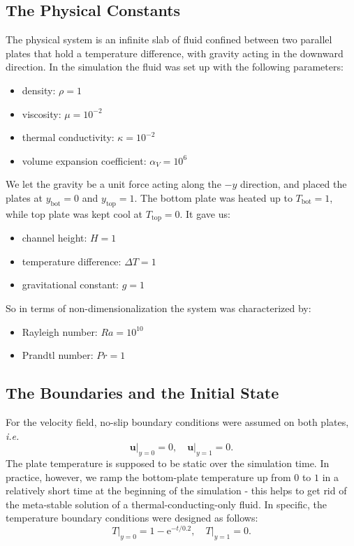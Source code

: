 \subsection{The Physical Constants}
The physical system is an infinite slab of fluid confined between two parallel plates that hold a temperature difference, with gravity acting in the downward direction. In the simulation the fluid was set up with the following parameters:
\begin{itemize}
    \item density: $\rho=1$
    \item viscosity: $\mu=10^{-2}$
    \item thermal conductivity: $\kappa=10^{-2}$
    \item volume expansion coefficient: $\alpha_V=10^6$
\end{itemize}
We let the gravity be a unit force acting along the $-y$ direction, and placed the plates at $y_\mathrm{bot}=0$ and $y_\mathrm{top}=1$. The bottom plate was heated up to $T_\mathrm{bot}=1$, while top plate was kept cool at $T_\mathrm{top}=0$. It gave us:
\begin{itemize}
    \item channel height: $H=1$
    \item temperature difference: $\Delta T=1$
    \item gravitational constant: $g=1$
\end{itemize}
So in terms of non-dimensionalization the system was characterized by:
\begin{itemize}
    \item Rayleigh number: $Ra=10^{10}$
    \item Prandtl number: $Pr=1$
\end{itemize}

\subsection{The Boundaries and the Initial State}
For the velocity field, no-slip boundary conditions were assumed on both plates, \emph{i.e.}
\begin{equation}
    \mathbf{u}\big|_{y=0}=0,\quad \mathbf{u}\big|_{y=1}=0.
\end{equation}
The plate temperature is supposed to be static over the simulation time. In practice, however, we ramp the bottom-plate temperature up from $0$ to $1$ in a relatively short time at the beginning of the simulation - this helps to get rid of the meta-stable solution of a thermal-conducting-only fluid. In specific, the temperature boundary conditions were designed as follows:
\begin{equation}
    T\big|_{y=0}=1-\mathrm{e}^{-t/0.2},\quad T\big|_{y=1}=0.
\end{equation}

